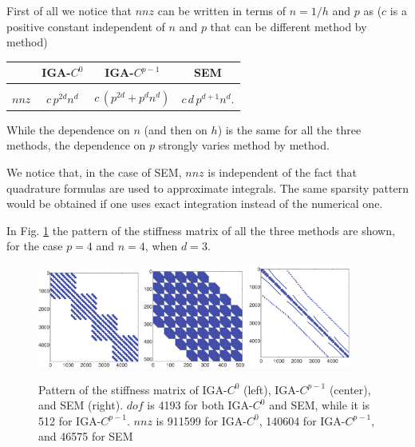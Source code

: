 \documentclass[11pt]{article}
\begin{document}
First of all we notice that $nnz$ can be written in terms of $n=1/h$ and $p$ as
($c$ is a positive constant independent of $n$ and $p$ 
that can be different method by method)
\begin{center}
\begin{tabular}{r|ccc}
 & IGA-$C^0$ & IGA-$C^{p-1}$ & SEM\\
\hline\\[-2mm]
$nnz $ & $c\,p^{2d}n^d$ & $c\,(p^{2d}+p^dn^d)$ & $c\,d\,p^{d+1}n^d$.
\end{tabular}
\end{center}

While the dependence on $n$ (and then on $h$) is the same for all the three 
methods, the dependence on $p$ strongly varies method by method.

We notice that, in the case of SEM, $nnz$ is independent of the fact that
quadrature formulas are used to approximate integrals. The same sparsity 
pattern would be obtained if one uses exact integration instead of the numerical one.

In Fig. \ref{fig:spyA} the pattern of the stiffness matrix of 
all the three methods are shown, for the case $p=4$ and $n=4$, when $d=3$.

\begin{figure}
\includegraphics[width=0.3\textwidth]{Images/matiga0_3d.pdf}
\includegraphics[width=0.3\textwidth]{Images/matigap_3d.pdf}
\includegraphics[width=0.3\textwidth]{Images/matsem_3d.pdf}
\caption{Pattern of the stiffness matrix of IGA-$C^0$ (left), IGA-$C^{p-1}$
(center), and SEM (right). $dof$ is 4193 for both IGA-$C^0$ and SEM, while it is
512 for IGA-$C^{p-1}$.
$nnz$ is 911599 for IGA-$C^0$, 
140604 for IGA-$C^{p-1}$, and 46575 for SEM}
\label{fig:spyA}
\end{figure}
\end{document}

